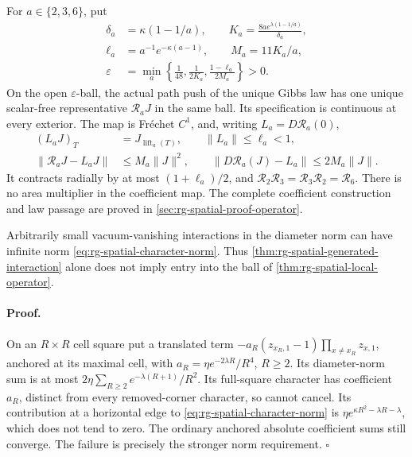For \(a\in\{2,3,6\}\), put
\begin{equation}
 \begin{aligned}
 \delta_a&=\kappa(1-1/a),\qquad
 K_a=\frac{8ae^{\lambda(1-1/a)}}{\delta_a},\\
 \ell_a&=a^{-1}e^{-\kappa(a-1)},\qquad M_a=11K_a/a,\\
 \varepsilon&=\min_a\left\{\frac1{48},\frac1{2K_a},
                              \frac{1-\ell_a}{2M_a}\right\}>0.
 \end{aligned}
 \label{eq:rg-spatial-local-radius}
\end{equation}
On the open \(\varepsilon\)-ball, the actual path push of the unique Gibbs
law has one unique scalar-free representative \(\mathcal R_aJ\) in the same
ball. Its specification is continuous at every exterior. The map is
Fr\'echet \(C^1\), and, writing \(L_a=D\mathcal R_a(0)\),
\begin{equation}
 \begin{split}
 (L_aJ)_T&=J_{\operatorname{lift}_a(T)},\qquad \|L_a\|\le\ell_a<1,\\
 \|\mathcal R_aJ-L_aJ\|&\le M_a\|J\|^2,\qquad
 \|D\mathcal R_a(J)-L_a\|\le2M_a\|J\|.
 \end{split}
 \label{eq:rg-spatial-local-estimates}
\end{equation}
It contracts radially by at most \((1+\ell_a)/2\), and
\(\mathcal R_2\mathcal R_3=\mathcal R_3\mathcal R_2=\mathcal R_6\).
There is no area multiplier in the coefficient map. The complete
coefficient construction and law passage are proved in
\cref{sec:rg-spatial-proof-operator}. 

Arbitrarily small vacuum-vanishing interactions in the diameter norm can have
infinite norm \cref{eq:rg-spatial-character-norm}. Thus
\cref{thm:rg-spatial-generated-interaction} alone does not imply entry into
the ball of \cref{thm:rg-spatial-local-operator}.

\paragraph{Proof.}
On an \(R\times R\) cell square put a translated term
\(-a_R(z_{x_R,1}-1)\prod_{x\ne x_R}z_{x,1}\), anchored at its maximal cell,
with \(a_R=\eta e^{-2\lambda R}/R^4\), \(R\ge2\). Its diameter-norm sum is
at most \(2\eta\sum_{R\ge2}e^{-\lambda(R+1)}/R^2\). Its full-square
character has coefficient \(a_R\), distinct from every removed-corner
character, so cannot cancel. Its contribution at a horizontal edge to
\cref{eq:rg-spatial-character-norm} is
\(\eta e^{\kappa R^2-\lambda R-\lambda}\), which does not tend to zero.
The ordinary anchored absolute coefficient sums still converge. The failure
is precisely the stronger norm requirement. \hfill\(\square\)

